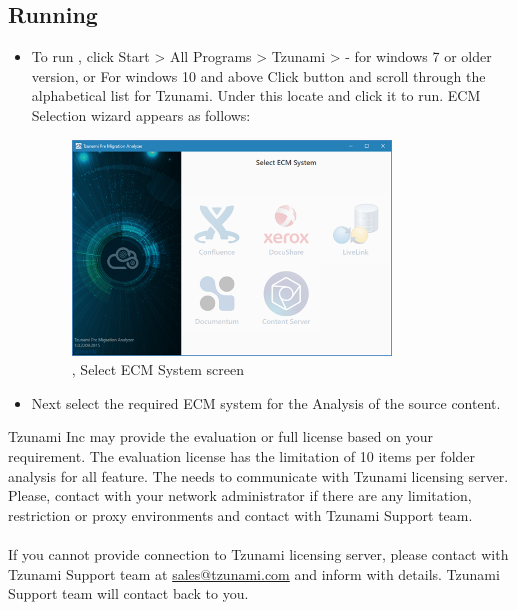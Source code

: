 \subsection{Running \appName}
\begin{itemize}
\item To run \appName, click Start > All Programs > Tzunami > \appName - for windows 7 or older version, or
For windows 10 and above
Click    button and scroll through the alphabetical list for Tzunami. Under this locate \appName and click it to run. ECM Selection wizard appears as follows:
\begin{figure} 
  \centering
	\includegraphics[width=0.8\textwidth]{Images/SelectEccmScreen.png}
 \caption{\appName, Select ECM System screen}
\end{figure}
\item Next select the required ECM system for the Analysis of the source content.
\end{itemize}
Tzunami Inc may provide the evaluation or full license based on your requirement. The evaluation license has the limitation of 10 items per folder analysis for all feature.
The \appName needs to communicate with Tzunami licensing server. Please, contact with your network administrator if there are any limitation, restriction or proxy environments and contact with Tzunami Support team. \\\\
If you cannot provide connection to Tzunami licensing server, please contact with Tzunami Support team at \href{mailto: sales@tzunami.com}{sales@tzunami.com} and inform with details. Tzunami Support team will contact back to you.
